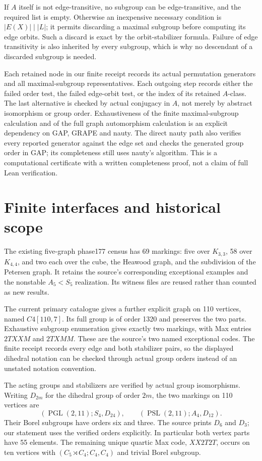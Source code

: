 \documentclass[11pt]{article}
\theoremstyle{definition}\newtheorem{definition}[theorem]{Definition}
\begin{document}
If $A$ itself is not edge-transitive, no subgroup can be edge-transitive,
and the required list is empty.  Otherwise an inexpensive necessary
condition is $|E(X)|\mid |L|$; it permits
discarding a maximal subgroup before computing its edge orbits.
Such a discard is exact by the orbit-stabilizer formula.  Failure of
edge transitivity is also inherited by every subgroup, which is why
no descendant of a discarded subgroup is needed.

Each retained node in our finite receipt records its actual permutation
generators and all maximal-subgroup representatives.  Each outgoing
step records either the failed order test, the failed edge-orbit test,
or the index of its retained $A$-class.  The last alternative is checked
by actual conjugacy in $A$, not merely by abstract isomorphism or group
order.  Exhaustiveness of the finite maximal-subgroup calculation and
of the full graph automorphism calculation is an explicit dependency
on GAP, GRAPE and nauty.  The direct nauty path also verifies every
reported generator against the edge set and checks the generated
group order in GAP; its completeness still uses nauty's algorithm.
This is a computational certificate with a written
completeness proof, not a claim of full Lean verification.

\section{Finite interfaces and historical scope}
The existing five-graph phase177 census has 69 markings: five over
$K_{3,3}$, 58 over $K_{4,4}$, and two each over the cube, the Heawood
graph, and the subdivision of the Petersen graph.  It retains the
source's corresponding exceptional examples and the nonstable
$A_5<S_5$ realization.  Its witness files are reused rather than
counted as new results.

The current primary catalogue gives a further explicit graph on 110
vertices, named $C4[110,7]$.  Its full group is of order 1320 and
preserves the two parts.  Exhaustive subgroup enumeration gives
exactly two markings, with Max entries $2TXXM$ and $2TXMM$.
These are the source's two named exceptional codes.  The finite
receipt records every edge and both stabilizer pairs, so the
displayed dihedral notation can be checked through actual group
orders instead of an unstated notation convention.

The acting groups and stabilizers are verified by actual group
isomorphisms.  Writing $D_{2m}$ for the dihedral group of order
$2m$, the two markings on 110 vertices are
\[
 (\operatorname{PGL}(2,11);S_4,D_{24}),\qquad
 (\operatorname{PSL}(2,11);A_4,D_{12}).
\]
Their Borel subgroups have orders six and three.  The source prints
$D_6$ and $D_3$; our statement uses the verified orders explicitly.
In particular both vertex parts have 55 elements.  The remaining
unique quartic Max code, $XX2T2T$, occurs on ten vertices with
$(C_5\rtimes C_4;C_4,C_4)$ and trivial Borel subgroup.
\end{document}
